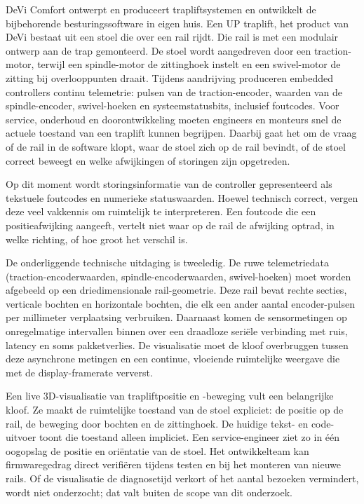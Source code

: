 \documentclass[10pt, a4paper, twocolumn]{article}
\begin{document}
DeVi Comfort ontwerpt en produceert trapliftsystemen en ontwikkelt de
bijbehorende besturingssoftware in eigen huis. Een UP traplift, het product van DeVi bestaat uit een
stoel die over een rail rijdt. Die rail is met een modulair ontwerp aan de trap gemonteerd.
De stoel wordt aangedreven door een traction-motor, terwijl een spindle-motor
de zittinghoek instelt en een swivel-motor de zitting bij overlooppunten draait.
Tijdens aandrijving produceren embedded controllers continu telemetrie:
pulsen van de traction-encoder, waarden van de spindle-encoder, swivel-hoeken en
systeemstatusbits, inclusief foutcodes. Voor service, onderhoud en
doorontwikkeling moeten engineers en monteurs snel de actuele toestand van een traplift
kunnen begrijpen. Daarbij gaat het om de vraag of de rail in de software klopt,
waar de stoel zich op de rail bevindt, of de stoel correct beweegt en welke
afwijkingen of storingen zijn opgetreden.

Op dit moment wordt storingsinformatie van de controller gepresenteerd als
tekstuele foutcodes en numerieke statuswaarden. Hoewel technisch correct,
vergen deze veel vakkennis om ruimtelijk te interpreteren. Een foutcode die
een positieafwijking aangeeft, vertelt niet waar op de rail de afwijking
optrad, in welke richting, of hoe groot het verschil is.

De onderliggende technische uitdaging is tweeledig. De ruwe telemetriedata
(traction-encoderwaarden, spindle-encoderwaarden, swivel-hoeken) moet worden afgebeeld
op een driedimensionale rail-geometrie. Deze rail bevat rechte secties,
verticale bochten en horizontale bochten, die elk een ander aantal
encoder-pulsen per millimeter verplaatsing verbruiken. Daarnaast komen de
sensormetingen op onregelmatige intervallen binnen over een draadloze seriële
verbinding met ruis, latency en soms pakketverlies. De visualisatie moet
de kloof overbruggen tussen deze asynchrone metingen en een continue, vloeiende
ruimtelijke weergave die met de display-framerate ververst.

Een live 3D-visualisatie van trapliftpositie en -beweging vult een belangrijke kloof. Ze maakt de ruimtelijke toestand van de stoel expliciet: de positie op de rail, de beweging door bochten en de zittinghoek. De huidige tekst- en code-uitvoer toont die toestand alleen impliciet. Een service-engineer ziet zo in één oogopslag de positie en oriëntatie van de stoel. Het ontwikkelteam kan firmwaregedrag direct verifiëren tijdens testen en bij het monteren van nieuwe rails. Of de visualisatie de diagnosetijd verkort of het aantal bezoeken vermindert, wordt niet onderzocht; dat valt buiten de scope van dit onderzoek.
\end{document}
